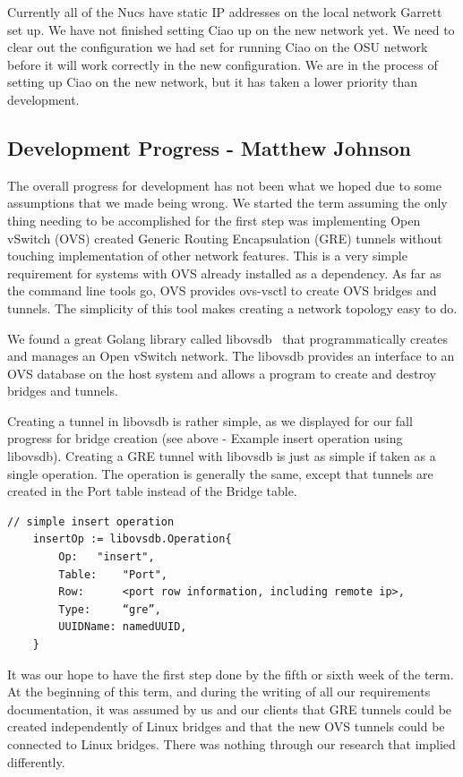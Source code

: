 \documentclass[10pt,onecolumn,journal,draftclsnofoot]{IEEEtran}
\begin{document}
Currently all of the Nucs have static IP addresses on the local network Garrett
set up. We have not finished setting Ciao up on the new network yet. We need to
clear out the configuration we had set for running Ciao on the OSU network
before it will work correctly in the new configuration. We are in the process of
setting up Ciao on the new network, but it has taken a lower priority than
development.

\subsection{Development Progress - Matthew Johnson}
The overall progress for development has not been what we hoped due to some
assumptions that we made being wrong. We started the term assuming the only
thing needing to be accomplished for the first step was implementing Open
vSwitch (OVS) created Generic Routing Encapsulation (GRE) tunnels without
touching implementation of other network features. This is a very simple
requirement for systems with OVS already installed as a dependency. As far as
the command line tools go, OVS provides ovs-vsctl to create OVS bridges and
tunnels. The simplicity of this tool makes creating a network topology easy to
do.

We found a great Golang library called libovsdb~\cite{libovsdb} that
programmatically creates and manages an Open vSwitch network. The libovsdb
provides an interface to an OVS database on the host system and allows a program
to create and destroy bridges and tunnels.

Creating a tunnel in libovsdb is rather simple, as we displayed for our fall
progress for bridge creation (see above - Example insert operation using
libovsdb). Creating a GRE tunnel with libovsdb is just as simple if taken as a
single operation. The operation is generally the same, except that tunnels are
created in the Port table instead of the Bridge table.

\begin{lstlisting}[caption=Example tunnel insert operation using libovsdb]
	// simple insert operation
	insertOp := libovsdb.Operation{
		Op:	  "insert",
		Table:	  "Port",
		Row:	  <port row information, including remote ip>,
		Type:     “gre”,
		UUIDName: namedUUID,
	}
\end{lstlisting}

It was our hope to have the first step done by the fifth or sixth week of the
term. At the beginning of this term, and during the writing of all our
requirements documentation, it was assumed by us and our clients that GRE
tunnels could be created independently of Linux bridges and that the new OVS
tunnels could be connected to Linux bridges. There was nothing through our
research that implied differently.
\end{document}
